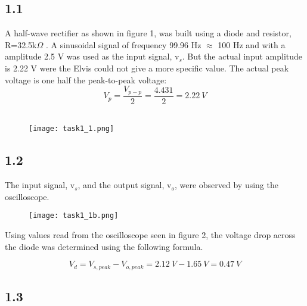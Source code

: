 \subsection*{1.1}

    A half-wave rectifier as shown in figure 1, was built using a  diode and resistor, R=32.5k$\Omega$ .
    A sinusoidal signal of frequency 99.96 Hz $\approx $ 100 Hz and with a amplitude 2.5 V was used as the input signal, v$_s$. But the actual input amplitude is 2.22 V were the Elvis could not give a more specific value. The actual peak voltage is one half the peak-to-peak voltage: $$ V_p = \dfrac{V_{p-p}}{2} = \dfrac{4.431}{2} = 2.22 \ V$$ \\

    \begin{figure}[h!]
        \centering
        \texttt{[image: task1\_1.png]}
    \end{figure}

\subsection*{1.2}

    The input signal, v$_s$, and the output signal, v$_o$, were observed by using the oscilloscope.\\

    \begin{figure}[h!]
        \centering
        \texttt{[image: task1\_1b.png]}
    \end{figure}

    Using values read from the oscilloscope seen in figure 2, the voltage drop across the diode was determined using the following formula.

    $$V_d = V_{s,peak} - V_{o,peak} = 2.12 \ V - 1.65 \ V = 0.47 \ V$$
\pagebreak
\subsection*{1.3}

